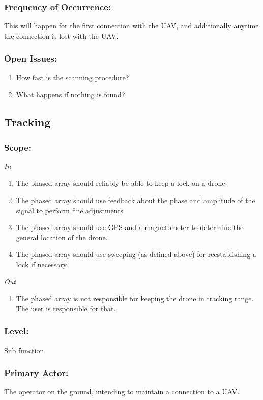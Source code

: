 \documentclass[ProductRequirements.tex]{subfiles}
\begin{document}
		\subsubsection*{Frequency of Occurrence:}
			This will happen for the first connection with the UAV, and additionally anytime the connection is lost with the UAV.
		\subsubsection*{Open Issues:}
			\begin{enumerate}\itemsep1pt
				\item How fast is the scanning procedure?
				\item What happens if nothing is found?
			\end{enumerate}		
	
	\subsection{Tracking}
	\subsubsection*{Scope:}
	\textit{In}
	\begin{enumerate}
		\item The phased array should reliably be able to keep a lock on a drone
		\item The phased array should use feedback about the phase and amplitude of the signal to perform fine adjustments
		\item The phased array should use GPS and a magnetometer to determine the general location of the drone.
		\item The phased array should use sweeping (as defined above) for reestablishing a lock if necessary.
	\end{enumerate}
	\textit{Out}
	\begin{enumerate}
		\item The phased array is not responsible for keeping the drone in tracking range. The user is responsible for that.
	\end{enumerate}
	\subsubsection*{Level:}
	Sub function
	\subsubsection*{Primary Actor:}
	The operator on the ground, intending to maintain a connection to a UAV.
\end{document}
